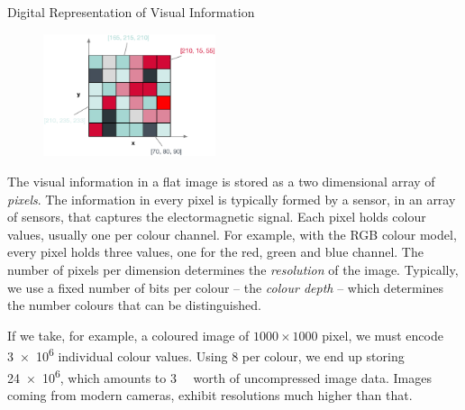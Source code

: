 \begin{example}[label=example:representation_visual_information]{Digital Representation of Visual Information}{}
    \begin{figure}
        \includegraphics[width=0.45\textwidth]{figures/example-visual-signal.eps}
    \end{figure}
    The visual information in a flat image is stored as a two dimensional array of \emph{pixels}. The information in every pixel is typically formed by a sensor, in an array of sensors, that captures the electormagnetic signal. Each pixel holds colour values, usually one per colour channel. For example, with the RGB colour model, every pixel holds three values, one for the red, green and blue channel. The number of pixels per dimension determines the \emph{resolution} of the image. Typically, we use a fixed number of bits per colour -- the \emph{colour depth} -- which determines the number colours that can be distinguished.

    If we take, for example, a coloured image of $1000 \times 1000$ pixel, we must encode \num{3e6} individual colour values. Using \SI{8}{\bit} per colour, we end up storing \SI{24e6}{\bit}, which amounts to \SI{3}{\mega\byte} worth of uncompressed image data. Images coming from modern cameras, exhibit resolutions much higher than that.
\end{example}

